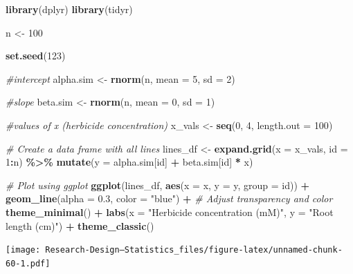 \documentclass[
]{book}
\newenvironment{Shaded}{\begin{snugshade}}{\end{snugshade}}
\newcommand{\AttributeTok}[1]{\textcolor[rgb]{0.13,0.29,0.53}{#1}}
\newcommand{\CommentTok}[1]{\textcolor[rgb]{0.56,0.35,0.01}{\textit{#1}}}
\newcommand{\DecValTok}[1]{\textcolor[rgb]{0.00,0.00,0.81}{#1}}
\newcommand{\FloatTok}[1]{\textcolor[rgb]{0.00,0.00,0.81}{#1}}
\newcommand{\FunctionTok}[1]{\textcolor[rgb]{0.13,0.29,0.53}{\textbf{#1}}}
\newcommand{\NormalTok}[1]{#1}
\newcommand{\OtherTok}[1]{\textcolor[rgb]{0.56,0.35,0.01}{#1}}
\newcommand{\SpecialCharTok}[1]{\textcolor[rgb]{0.81,0.36,0.00}{\textbf{#1}}}
\newcommand{\StringTok}[1]{\textcolor[rgb]{0.31,0.60,0.02}{#1}}
\begin{document}
\begin{Shaded}
\begin{Highlighting}[]
\FunctionTok{library}\NormalTok{(dplyr)}
\FunctionTok{library}\NormalTok{(tidyr)}

\NormalTok{n }\OtherTok{\textless{}{-}} \DecValTok{100}

\FunctionTok{set.seed}\NormalTok{(}\DecValTok{123}\NormalTok{)}

\CommentTok{\#intercept}
\NormalTok{alpha.sim }\OtherTok{\textless{}{-}} \FunctionTok{rnorm}\NormalTok{(n, }\AttributeTok{mean =} \DecValTok{5}\NormalTok{, }\AttributeTok{sd =} \DecValTok{2}\NormalTok{)}

\CommentTok{\#slope}
\NormalTok{beta.sim }\OtherTok{\textless{}{-}} \FunctionTok{rnorm}\NormalTok{(n, }\AttributeTok{mean =} \DecValTok{0}\NormalTok{, }\AttributeTok{sd =} \DecValTok{1}\NormalTok{)}

\CommentTok{\#values of x (herbicide concentration)}
\NormalTok{x\_vals }\OtherTok{\textless{}{-}} \FunctionTok{seq}\NormalTok{(}\DecValTok{0}\NormalTok{, }\DecValTok{4}\NormalTok{, }\AttributeTok{length.out =} \DecValTok{100}\NormalTok{)}

\CommentTok{\# Create a data frame with all lines}
\NormalTok{lines\_df }\OtherTok{\textless{}{-}} \FunctionTok{expand.grid}\NormalTok{(}\AttributeTok{x =}\NormalTok{ x\_vals, }\AttributeTok{id =} \DecValTok{1}\SpecialCharTok{:}\NormalTok{n) }\SpecialCharTok{\%\textgreater{}\%}
  \FunctionTok{mutate}\NormalTok{(}\AttributeTok{y =}\NormalTok{ alpha.sim[id] }\SpecialCharTok{+}\NormalTok{ beta.sim[id] }\SpecialCharTok{*}\NormalTok{ x)}

\CommentTok{\# Plot using ggplot}
\FunctionTok{ggplot}\NormalTok{(lines\_df, }\FunctionTok{aes}\NormalTok{(}\AttributeTok{x =}\NormalTok{ x, }\AttributeTok{y =}\NormalTok{ y, }\AttributeTok{group =}\NormalTok{ id)) }\SpecialCharTok{+}
  \FunctionTok{geom\_line}\NormalTok{(}\AttributeTok{alpha =} \FloatTok{0.3}\NormalTok{, }\AttributeTok{color =} \StringTok{"blue"}\NormalTok{) }\SpecialCharTok{+}  \CommentTok{\# Adjust transparency and color}
  \FunctionTok{theme\_minimal}\NormalTok{() }\SpecialCharTok{+}
  \FunctionTok{labs}\NormalTok{(}\AttributeTok{x =} \StringTok{"Herbicide concentration (mM)"}\NormalTok{,}
       \AttributeTok{y =} \StringTok{"Root length (cm)"}\NormalTok{) }\SpecialCharTok{+} 
  \FunctionTok{theme\_classic}\NormalTok{()}
\end{Highlighting}
\end{Shaded}

\texttt{[image: Research-Design---Statistics\_files/figure-latex/unnamed-chunk-60-1.pdf]}
\end{document}
